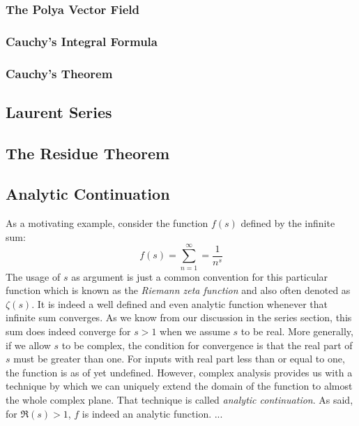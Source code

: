 \subsubsection{The Polya Vector Field}

\subsubsection{Cauchy's Integral Formula}

\subsubsection{Cauchy's Theorem}


\subsection{Laurent Series}

\subsection{The Residue Theorem}

\subsection{Analytic Continuation}
As a motivating example, consider the function $f(s)$ defined by the infinite sum:
\begin{equation}
f(s) = \sum_{n=1}^{\infty} = \frac{1}{n^s}
\end{equation}
The usage of $s$ as argument is just a common convention for this particular function which is known as the \emph{Riemann zeta function} and also often denoted as $\zeta (s)$. It is indeed a well defined and even analytic function whenever that infinite sum converges. As we know from our discussion in the series section, this sum does indeed converge for $s > 1$ when we assume $s$ to be real. More generally, if we allow $s$ to be complex, the condition for convergence is that the real part of $s$ must be greater than one. For inputs with real part less than or equal to one, the function is as of yet undefined. However, complex analysis provides us with a technique by which we can uniquely extend the domain of the function to almost the whole complex plane. That technique is called \emph{analytic continuation}. As said, for $\Re(s) > 1$, $f$ is indeed an analytic function. ...


